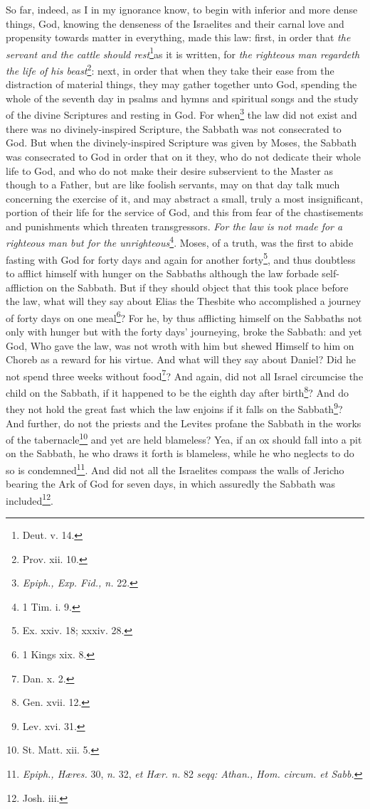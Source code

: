 So far, indeed, as I in my ignorance know, to begin with inferior and more dense things, God, knowing the denseness of the Israelites and their carnal love and propensity towards matter in everything, made this law: first, in order that \emph{the servant and the cattle should rest}\footnote{Deut. v. 14.}as it is written, for \emph{the righteous man regardeth the life of his beast}\footnote{Prov. xii. 10.}: next, in order that when they take their ease from the distraction of material things, they may gather together unto God, spending the whole of the seventh day in psalms and hymns and spiritual songs and the study of the divine Scriptures and resting in God. For when\footnote{\emph{Epiph., Exp. Fid., n. }22.} the law did not exist and there was no divinely-inspired Scripture, the Sabbath was not consecrated to God. But when the divinely-inspired Scripture was given by Moses, the Sabbath was consecrated to God in order that on it they, who do not dedicate their whole life to God, and who do not make their desire subservient to the Master as though to a Father, but are like foolish servants, may on that day talk much concerning the exercise of it, and may abstract a small, truly a most insignificant, portion of their life for the service of God, and this from fear of the chastisements and punishments which threaten transgressors. \emph{For the law is not made for a righteous man but for the unrighteous}\footnote{1 Tim. i. 9.}. Moses, of a truth, was the first to abide fasting with God for forty days and again for another forty\footnote{Ex. xxiv. 18; xxxiv. 28.}, and thus doubtless to afflict himself with hunger on the Sabbaths although the law forbade self-affliction on the Sabbath. But if they should object that this took place before the law, what will they say about Elias the Thesbite who accomplished a journey of forty days on one meal\footnote{1 Kings xix. 8.}? For he, by thus afflicting himself on the Sabbaths not only with hunger but with the forty days’ journeying, broke the Sabbath: and yet God, Who gave the law, was not wroth with him but shewed Himself to him on Choreb as a reward for his virtue. And what will they say about Daniel? Did he not spend three weeks without food\footnote{Dan. x. 2.}? And again, did not all Israel circumcise the child on the Sabbath, if it happened to be the eighth day after birth\footnote{Gen. xvii. 12.}? And do they not hold the great fast which the law enjoins if it falls on the Sabbath\footnote{Lev. xvi. 31.}? And further, do not the priests and the Levites profane the Sabbath in the works of the tabernacle\footnote{St. Matt. xii. 5.} and yet are held blameless? Yea, if an ox should fall into a pit on the Sabbath, he who draws it forth is blameless, while he who neglects to do so is condemned\footnote{\emph{Epiph., Hæres. }30, \emph{n. }32, \emph{et Hær. n. }82 \emph{seqq: Athan., Hom. circum. et Sabb.}}. And did not all the Israelites compass the walls of Jericho bearing the Ark of God for seven days, in which assuredly the Sabbath was included\footnote{Josh. iii.}.

